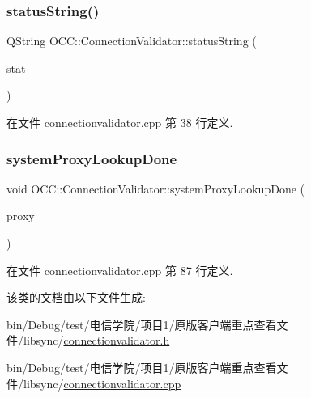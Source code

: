 \subsubsection{\texorpdfstring{status\+String()}{statusString()}}
{\footnotesize\ttfamily Q\+String O\+C\+C\+::\+Connection\+Validator\+::status\+String (\begin{DoxyParamCaption}\item[{\hyperlink{class_o_c_c_1_1_connection_validator_a8f1192e5d8ff687dbf93faf38af67f8b}{Status}}]{stat }\end{DoxyParamCaption})\hspace{0.3cm}{\ttfamily [static]}}



在文件 connectionvalidator.\+cpp 第 38 行定义.

\mbox{\label{class_o_c_c_1_1_connection_validator_a502723c398e1656d4dd221eab152bd40}} 
\subsubsection{\texorpdfstring{system\+Proxy\+Lookup\+Done}{systemProxyLookupDone}}
{\footnotesize\ttfamily void O\+C\+C\+::\+Connection\+Validator\+::system\+Proxy\+Lookup\+Done (\begin{DoxyParamCaption}\item[{const Q\+Network\+Proxy \&}]{proxy }\end{DoxyParamCaption})\hspace{0.3cm}{\ttfamily [slot]}}



在文件 connectionvalidator.\+cpp 第 87 行定义.



该类的文档由以下文件生成\+:\begin{DoxyCompactItemize}
\item 
bin/\+Debug/test/电信学院/项目1/原版客户端重点查看文件/libsync/\hyperlink{connectionvalidator_8h}{connectionvalidator.\+h}\item 
bin/\+Debug/test/电信学院/项目1/原版客户端重点查看文件/libsync/\hyperlink{connectionvalidator_8cpp}{connectionvalidator.\+cpp}\end{DoxyCompactItemize}
